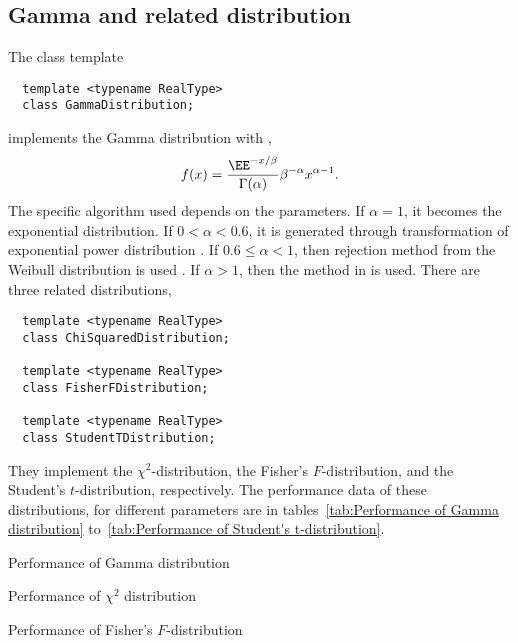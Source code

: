 \subsection{Gamma and related distribution}
\label{sub:Gamma and related distribution}

The class template
\begin{Verbatim}
  template <typename RealType>
  class GammaDistribution;
\end{Verbatim}
implements the Gamma distribution with \pdf,
\begin{equation*}
  f(x) = \frac{\EE^{-x/\beta}}{\Gamma(\alpha)}\beta^{-\alpha}x^{\alpha-1}.
\end{equation*}
The specific algorithm used depends on the parameters. If $\alpha = 1$, it
becomes the exponential distribution. If $0 < \alpha < 0.6$, it is generated
through transformation of exponential power distribution
\parencite[sec~2.6]{Devroye:1986gi}. If $0.6\le\alpha<1$, then rejection method
from the Weibull distribution is used \parencite[sec.~3.4]{Devroye:1986gi}. If
$\alpha > 1$, then the method in \textcite{Marsaglia:2000vq} is used. There are
three related distributions,
\begin{Verbatim}
  template <typename RealType>
  class ChiSquaredDistribution;

  template <typename RealType>
  class FisherFDistribution;

  template <typename RealType>
  class StudentTDistribution;
\end{Verbatim}
They implement the $\chi^2$-distribution, the Fisher's $F$-distribution, and
the Student's $t$-distribution, respectively. The performance data of these
distributions, for different parameters are in tables~\ref{tab:Performance of
  Gamma distribution} to~\ref{tab:Performance of Student's t-distribution}.

\begin{table}
  \caption{Performance of Gamma distribution}
  \label{tab:Performance of Gamma distribution}
\end{table}

\begin{table}
  \caption{Performance of $\chi^2$ distribution}
  \label{tab:Performance of chi-squared distribution}
\end{table}

\begin{table}
  \caption{Performance of Fisher's $F$-distribution}
  \label{tab:Performance of Fisher's F-distribution}
\end{table}

